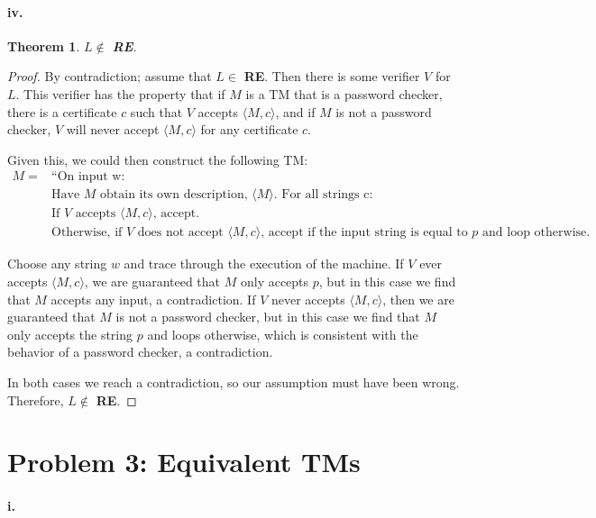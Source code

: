 \documentclass[10pt,letter]{article}
\newtheorem*{thm}{Theorem}
\begin{document}
\paragraph{iv.} \begin{thm} $L \not \in $ \textbf{RE}. \end{thm}
\begin{proof} 

By contradiction; assume that $L \in$ \textbf{RE}. Then there is some verifier $V$ for $L$. This verifier has the property that if $M$ is a TM that is a password checker, there is a certificate $c$ such that $V$ accepts $\langle M, c \rangle$, and if $M$ is not a password checker, $V$ will never accept $\langle M, c \rangle$ for any certificate $c$.

Given this, we could then construct the following TM:
\begin{align*}
M = &\text{“On input w:}\\
&\text{Have $M$ obtain its own description, $\langle M \rangle$. For all strings c:}\\
&\text{If $V$ accepts $\langle M, c \rangle$, accept.}\\
&\text{Otherwise, if $V$ does not accept $\langle M, c \rangle$, accept if the input string is equal to $p$ and loop otherwise.}
\end{align*}

Choose any string $w$ and trace through the execution of the machine. If $V$ ever accepts $\langle M, c \rangle$, we are guaranteed that $M$ only accepts $p$, but in this case we find that $M$ accepts any input, a contradiction. If $V$ never accepts $\langle M, c \rangle$, then we are guaranteed that $M$ is not a password checker, but in this case we find that $M$ only accepts the string $p$ and loops otherwise, which is consistent with the behavior of a password checker, a contradiction.

In both cases we reach a contradiction, so our assumption must have been wrong. Therefore, $L \not \in$ \textbf{RE}.
\end{proof}

\section*{Problem 3: Equivalent TMs}

\paragraph{i.} 

\end{document}
